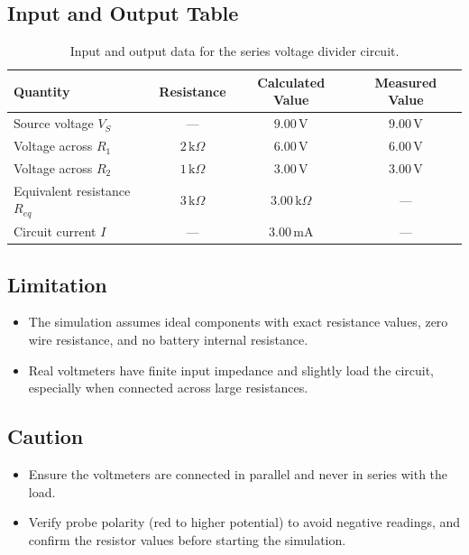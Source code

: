 \documentclass[11pt,a4paper]{article}
\begin{document}
\subsection{Input and Output Table}
\begin{table}[H]
    \centering
    \caption{Input and output data for the series voltage divider circuit.}
    \label{tab:part1_io}
    \begin{tabularx}{\textwidth}{@{}l C C C@{}}
        \toprule
        \textbf{Quantity} & \textbf{Resistance} & \textbf{Calculated Value} & \textbf{Measured Value} \\
        \midrule
        Source voltage $V_S$ & --- & $9.00\,\text{V}$ & $9.00\,\text{V}$ \\
        Voltage across $R_1$ & $2\,\text{k}\Omega$ & $6.00\,\text{V}$ & $6.00\,\text{V}$ \\
        Voltage across $R_2$ & $1\,\text{k}\Omega$ & $3.00\,\text{V}$ & $3.00\,\text{V}$ \\
        Equivalent resistance $R_{eq}$ & $3\,\text{k}\Omega$ & $3.00\,\text{k}\Omega$ & --- \\
        Circuit current $I$ & --- & $3.00\,\text{mA}$ & --- \\
        \bottomrule
    \end{tabularx}
\end{table}

\subsection{Limitation}
\begin{itemize}
    \item The simulation assumes ideal components with exact resistance values, zero wire resistance, and no battery internal resistance.
    \item Real voltmeters have finite input impedance and slightly load the circuit, especially when connected across large resistances.
\end{itemize}

\subsection{Caution}
\begin{itemize}
    \item Ensure the voltmeters are connected in parallel and never in series with the load.
    \item Verify probe polarity (red to higher potential) to avoid negative readings, and confirm the resistor values before starting the simulation.
\end{itemize}
\end{document}
